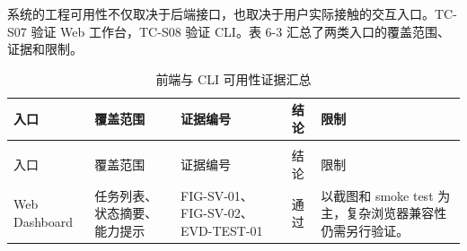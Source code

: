系统的工程可用性不仅取决于后端接口，也取决于用户实际接触的交互入口。TC-S07
验证 Web 工作台，TC-S08 验证 CLI。表 6-3
汇总了两类入口的覆盖范围、证据和限制。

{%
\begin{longtable}{@{}
  >{\centering\arraybackslash}p{}
  >{\centering\arraybackslash}p{}
  >{\centering\arraybackslash}p{}
  >{\centering\arraybackslash}p{}
  >{\centering\arraybackslash}p{}@{}}
\caption{前端与 CLI 可用性证据汇总}\label{tab:6-3--cli}\\
\toprule
\begin{minipage}[b]{\linewidth}\centering
入口
\end{minipage} & \begin{minipage}[b]{\linewidth}\centering
覆盖范围
\end{minipage} & \begin{minipage}[b]{\linewidth}\centering
证据编号
\end{minipage} & \begin{minipage}[b]{\linewidth}\centering
结论
\end{minipage} & \begin{minipage}[b]{\linewidth}\centering
限制
\end{minipage} \\
\midrule
\endfirsthead
\multicolumn{5}{r}{表\thetable（续表）} \\
\toprule
\begin{minipage}[b]{\linewidth}\centering
入口
\end{minipage} & \begin{minipage}[b]{\linewidth}\centering
覆盖范围
\end{minipage} & \begin{minipage}[b]{\linewidth}\centering
证据编号
\end{minipage} & \begin{minipage}[b]{\linewidth}\centering
结论
\end{minipage} & \begin{minipage}[b]{\linewidth}\centering
限制
\end{minipage} \\
\midrule
\endhead
\midrule
\endfoot
\bottomrule
\endlastfoot
Web Dashboard & 任务列表、状态摘要、能力提示 &
FIG-SV-01、FIG-SV-02、EVD-TEST-01 & 通过 & 以截图和 smoke test
为主，复杂浏览器兼容性仍需另行验证。 \\

\end{longtable}}
